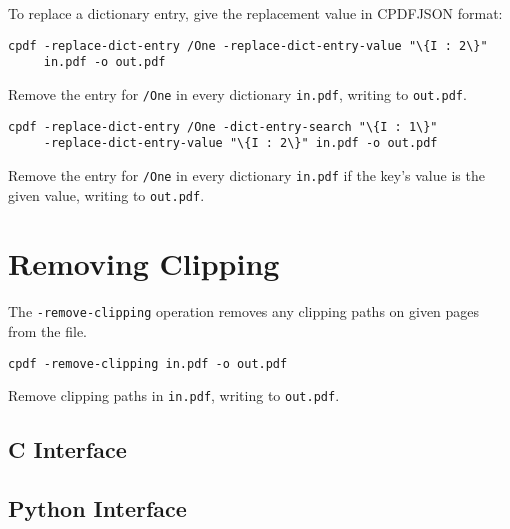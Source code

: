 \documentclass{book}
\begin{document}
To replace a dictionary entry, give the replacement value in CPDFJSON format:

  \begin{framed}
  \small\noindent\verb!cpdf -replace-dict-entry /One -replace-dict-entry-value "\{I : 2\}"!\\
  \small\noindent\verb!     in.pdf -o out.pdf!

  \vspace{2.5mm}
  \noindent Remove the entry for \texttt{/One} in every dictionary \texttt{in.pdf}, writing to \texttt{out.pdf}. 

  \vspace{2.5mm}

  \small\noindent\verb!cpdf -replace-dict-entry /One -dict-entry-search "\{I : 1\}"!\\
  \small\noindent\verb!     -replace-dict-entry-value "\{I : 2\}" in.pdf -o out.pdf!

  \vspace{2.5mm}
  \noindent Remove the entry for \texttt{/One} in every dictionary \texttt{in.pdf} if the key's value is the given value, writing to \texttt{out.pdf}. 
  \end{framed}

\section{Removing Clipping}


The \texttt{-remove-clipping} operation removes any clipping paths on given pages from the file.

  \begin{framed}
  \small\noindent\verb!cpdf -remove-clipping in.pdf -o out.pdf!

  \vspace{2.5mm}
  \noindent Remove clipping paths in \texttt{in.pdf}, writing to \texttt{out.pdf}. 
  \end{framed}

\begin{cpdflib}
\clearpage
\section*{C Interface}
\begin{small}\tt

\end{small}
\end{cpdflib}

\begin{pycpdflib}
\clearpage
\section*{Python Interface}
\begin{small}\tt

\end{small}
\end{pycpdflib}
\end{document}
